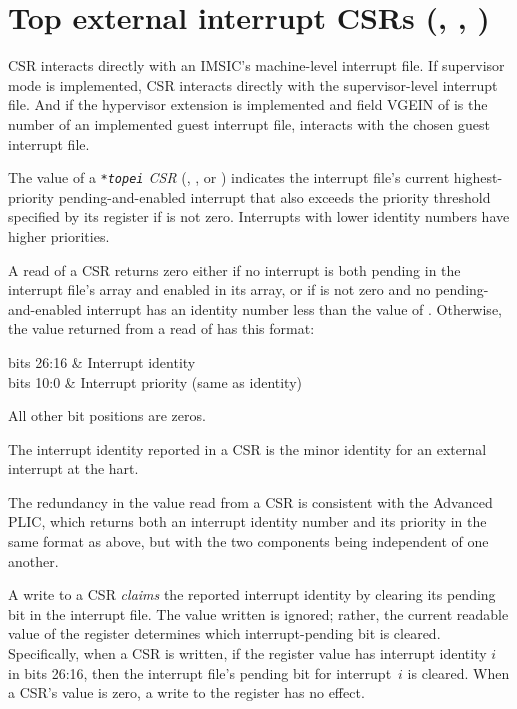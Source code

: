 \section{%
Top external interrupt CSRs (, , )%
}

CSR  interacts directly with
an IMSIC's machine-level interrupt file.
If supervisor mode is implemented, CSR  interacts
directly with the supervisor-level interrupt file.
And if the hypervisor extension is implemented and field VGEIN of
 is the number of an implemented guest interrupt file,
 interacts with the chosen guest interrupt file.

The value of a \emph{\texttt{*topei} CSR} (, , or
) indicates the interrupt file's current highest-priority
pending-and-enabled interrupt that also exceeds the priority threshold
specified by its  register if  is not
zero.
Interrupts with lower identity numbers have higher priorities.

A read of a  CSR returns zero either if no interrupt
is both pending in the interrupt file's  array and enabled
in its  array, or if  is not zero and no
pending-and-enabled interrupt has an identity number less than the
value of .
Otherwise, the value returned from a read of  has this
format:
\begin{displayLinesTable}[l@{\quad}l]
bits 26:16 & Interrupt identity \\
bits 10:0  & Interrupt priority (same as identity) \\
\end{displayLinesTable}
All other bit positions are zeros.

The interrupt identity reported in a  CSR is the minor
identity for an external interrupt at the hart.

\begin{commentary}
The redundancy in the value read from a  CSR is consistent
with the Advanced PLIC, which returns both an interrupt identity
number and its priority in the same format as above, but with the two
components being independent of one another.
\end{commentary}

A write to a  CSR \emph{claims} the reported interrupt
identity by clearing its pending bit in the interrupt file.
The value written is ignored;
rather, the current readable value of the register determines which
interrupt-pending bit is cleared.
Specifically, when a  CSR is written, if the register value
has interrupt identity $i$ in bits 26:16, then the interrupt file's
pending bit for interrupt~$i$ is cleared.
When a  CSR's value is zero, a write to the register has no
effect.


